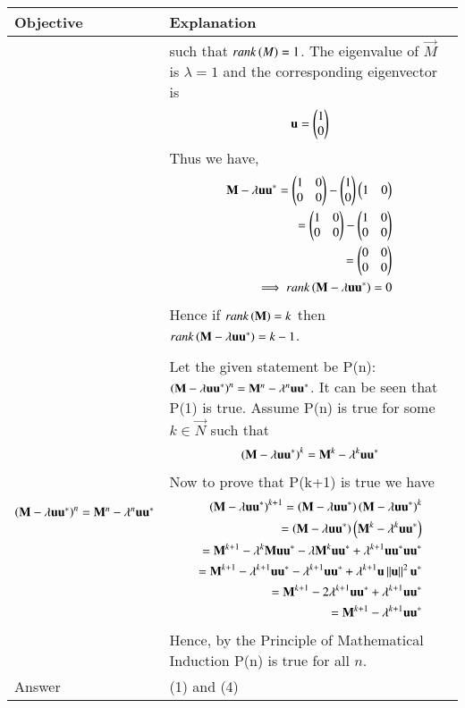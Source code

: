 \begin{table*}[htbp]
        \centering
\begin{tabular}{|m{2.0in}|m{5.0in}|} \hline
		\textbf{Objective} & \textbf{Explanation} \\ \hline
		&
	such that $rank\left(M\right)=1$. The eigenvalue of $\vec{M}$ is $\lambda=1$ 
	and the corresponding eigenvector is
	\begin{align}
	\mathbf{u}=\begin{pmatrix}1\\0\end{pmatrix}
	\end{align}
	Thus we have,
	\begin{align}
	\mathbf{M}-\lambda\mathbf{uu^*}=\begin{pmatrix}1&0\\0&0\end{pmatrix}-\begin{pmatrix}1\\0\end{pmatrix}\begin{pmatrix}1&0\end{pmatrix} \\
		=\begin{pmatrix}1&0\\0&0\end{pmatrix}-\begin{pmatrix}1&0\\0&0\end{pmatrix} \\
		=\begin{pmatrix}0&0\\0&0\end{pmatrix} \\
		\implies rank\left(\mathbf{M}-\lambda\mathbf{uu^*}\right)=0
	\end{align}
Hence if $rank\left(\mathbf{M}\right)=k$ 
		then $rank\left(\mathbf{M}-\lambda\mathbf{uu^*}\right)=k-1$. \\ 
		& \\ \hline
	$\left(\mathbf{M}-\lambda\mathbf{uu^*}\right)^n=\mathbf{M}^n-\lambda^n\mathbf{uu^*}$  & 
		Let the given statement be 
	P(n):$\left(\mathbf{M}-\lambda\mathbf{uu^*}\right)^n=\mathbf{M}^n-\lambda^n\mathbf{uu^*}$.
		It can be seen that P(1) is true. Assume P(n) is true for some 
		$k\in \vec{N}$ such that
	\begin{align}
	\left(\mathbf{M}-\lambda\mathbf{uu^*}\right)^k=\mathbf{M}^k-\lambda^k\mathbf{uu^*}
	\end{align}
	Now to prove that P(k+1) is true we have
	\begin{align}
	\left(\mathbf{M}-\lambda\mathbf{uu^*}\right)^{k+1}
	=\left(\mathbf{M}-\lambda\mathbf{uu^*}\right)\left(\mathbf{M}-\lambda\mathbf{uu^*}\right)^k \\
	=\left(\mathbf{M}-\lambda\mathbf{uu^*}\right)\left(\mathbf{M}^k-\lambda^k\mathbf{uu^*}\right) \\
	=\mathbf{M}^{k+1}-\lambda^k\mathbf{Muu^*}-\lambda\mathbf{M}^k\mathbf{uu^*} + 
		\lambda^{k+1}\mathbf{uu^*uu^*} \\
	=\mathbf{M}^{k+1}-\lambda^{k+1}\mathbf{uu^*}-\lambda^{k+1}\mathbf{uu^*} +
		\lambda^{k+1}\mathbf{u}\left\lVert\mathbf{u}\right\rVert^2\mathbf{u}^* \\
	=\mathbf{M}^{k+1}-2\lambda^{k+1}\mathbf{uu^*}+\lambda^{k+1}\mathbf{uu^*} \\
	=\mathbf{M}^{k+1}-\lambda^{k+1}\mathbf{uu^*}
	\end{align}
	Hence, by the Principle of Mathematical Induction P(n) is true for all 
	$n$.\\ \hline
		Answer& (1) and (4) \\ \hline
\end{tabular}
        \caption{} \label{eq:solutions/2018/dec/76/1}
\end{table*}
